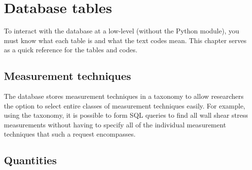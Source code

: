 %

\chapter{Database tables}

To interact with the database at a low-level (without the Python module), you
must know what each table is and what the text codes mean.  This chapter serves
as a quick reference for the tables and codes.


\section{Measurement techniques}

The database stores measurement techniques in a taxonomy to allow researchers
the option to select entire classes of measurement techniques easily.  For
example, using the taxonomy, it is possible to form SQL queries to find all
wall shear stress measurements without having to specify all of the individual
measurement techniques that such a request encompasses.




\section{Quantities}


